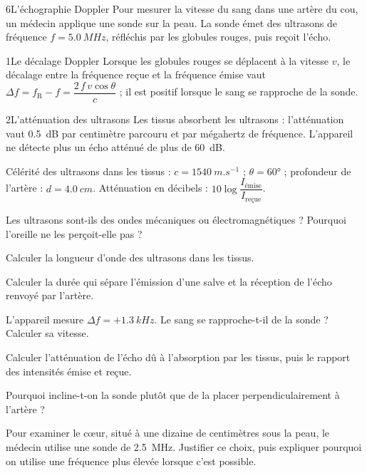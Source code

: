 \begin{exoBac}{6}{L'échographie Doppler}
Pour mesurer la vitesse du sang dans une artère du cou, un médecin applique une sonde sur la peau. La sonde émet des
ultrasons de fréquence $f=\qty{5,0}{MHz}$, réfléchis par les globules rouges, puis reçoit l'écho.
\begin{docu}{1}{Le décalage Doppler}
Lorsque les globules rouges se déplacent à la vitesse $v$, le décalage entre la fréquence reçue et la fréquence émise
vaut $\Delta f=f_\mathrm{R}-f=\dfrac{2\,f\,v\cos\theta}{c}$ ; il est positif lorsque le sang se rapproche de la sonde.
\end{docu}
\begin{docu}{2}{L'atténuation des ultrasons}
Les tissus absorbent les ultrasons : l'atténuation vaut \qty{0,5}{dB} par centimètre parcouru et par mégahertz de
fréquence. L'appareil ne détecte plus un écho atténué de plus de \qty{60}{dB}.
\end{docu}
\begin{donnees}
Célérité des ultrasons dans les tissus : $c=\qty{1540}{m.s^{-1}}$ ; $\theta=\ang{60}$ ; profondeur de l'artère : $d=\qty{4,0}{cm}$.
Atténuation en décibels : $10\log\dfrac{I_\text{émise}}{I_\text{reçue}}$.
\end{donnees}
\begin{questions}
\item Les ultrasons sont-ils des ondes mécaniques ou électromagnétiques ? Pourquoi l'oreille ne les perçoit-elle pas ?
\item Calculer la longueur d'onde des ultrasons dans les tissus.
\item Calculer la durée qui sépare l'émission d'une salve et la réception de l'écho renvoyé par l'artère.
\item L'appareil mesure $\Delta f=+\qty{1,3}{kHz}$. Le sang se rapproche-t-il de la sonde ? Calculer sa vitesse.
\item Calculer l'atténuation de l'écho dû à l'absorption par les tissus, puis le rapport des intensités émise et reçue.
\item Pourquoi incline-t-on la sonde plutôt que de la placer perpendiculairement à l'artère ?
\item \initiative Pour examiner le cœur, situé à une dizaine de centimètres sous la peau, le médecin utilise une sonde de
\qty{2,5}{MHz}. Justifier ce choix, puis expliquer pourquoi on utilise une fréquence plus élevée lorsque c'est possible.
\end{questions}
\end{exoBac}

